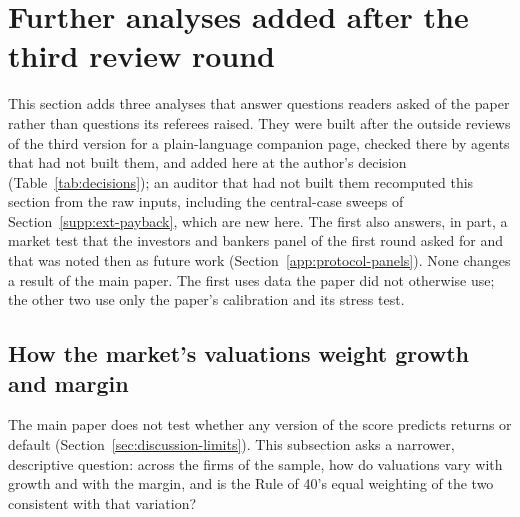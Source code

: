 \clearpage
\section{Further analyses added after the third review round}\label{supp:extensions}
This section adds three analyses that answer questions readers asked of the paper rather than questions its referees raised. They were built after the outside reviews of the third version for a plain-language companion page, checked there by agents that had not built them, and added here at the author's decision (Table~\ref{tab:decisions}); an auditor that had not built them recomputed this section from the raw inputs, including the central-case sweeps of Section~\ref{supp:ext-payback}, which are new here. The first also answers, in part, a market test that the investors and bankers panel of the first round asked for and that was noted then as future work (Section~\ref{app:protocol-panels}). None changes a result of the main paper. The first uses data the paper did not otherwise use; the other two use only the paper's calibration and its stress test.

\subsection{How the market's valuations weight growth and margin}\label{supp:ext-valuation}
The main paper does not test whether any version of the score predicts returns or default (Section~\ref{sec:discussion-limits}). This subsection asks a narrower, descriptive question: across the firms of the sample, how do valuations vary with growth and with the margin, and is the Rule of 40's equal weighting of the two consistent with that variation?

